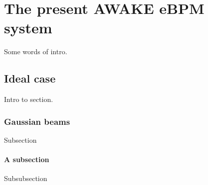 \chapter[The present AWAKE eBPM system]{The present AWAKE eBPM system}

Some words of intro.

\section[Ideal case]{Ideal case}

Intro to section.

\subsection[Gaussian beams]{Gaussian beams}

Subsection

\subsubsection{A subsection}

Subsubsection
